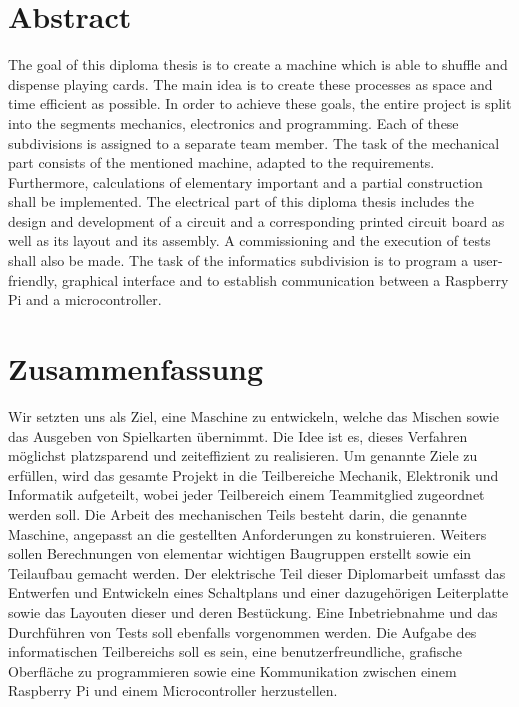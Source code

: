 \newpage
\thispagestyle{empty}
\mbox{}

\clearpage

\section*{Abstract}
\label{sec:abstract}
The goal of this diploma thesis is to create a machine which is able to shuffle and dispense playing cards.
The main idea is to create these processes as space and time efficient as possible.
In order to achieve these goals, the entire project is split into the segments mechanics, electronics and programming.
Each of these subdivisions is assigned to a separate team member.
The task of the mechanical part consists of the mentioned machine, adapted to the requirements.
Furthermore, calculations of elementary important and a partial construction shall be implemented.
The electrical part of this diploma thesis includes the design and development of a circuit and a corresponding printed circuit board as well as its layout and its assembly.
A commissioning and the execution of tests shall also be made.
The task of the informatics subdivision is to program a user-friendly, graphical interface and to establish communication between a Raspberry Pi and a microcontroller.
\section*{Zusammenfassung}
Wir setzten uns als Ziel, eine Maschine zu entwickeln, welche das Mischen sowie das Ausgeben von Spielkarten übernimmt.
Die Idee ist es, dieses Verfahren möglichst platzsparend und zeiteffizient zu realisieren.
Um genannte Ziele zu erfüllen, wird das gesamte Projekt in die Teilbereiche Mechanik, Elektronik und Informatik aufgeteilt, wobei jeder Teilbereich einem Teammitglied zugeordnet werden soll.
Die Arbeit des mechanischen Teils besteht darin, die genannte Maschine, angepasst an die gestellten Anforderungen zu konstruieren.
Weiters sollen Berechnungen von elementar wichtigen Baugruppen erstellt sowie ein Teilaufbau gemacht werden.
Der elektrische Teil dieser Diplomarbeit umfasst das Entwerfen und Entwickeln eines Schaltplans
und einer dazugehörigen Leiterplatte sowie das Layouten dieser und deren Bestückung.
Eine Inbetriebnahme und das Durchführen von Tests soll ebenfalls vorgenommen werden.
Die Aufgabe des informatischen Teilbereichs soll es sein, eine benutzerfreundliche, grafische Oberfläche zu programmieren sowie eine Kommunikation zwischen einem Raspberry Pi und einem Microcontroller herzustellen.
\clearpage

